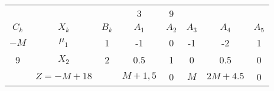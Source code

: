     \begin{tabular}{cccccccc}
    \hline
    \hline
            &         &         & 3       & 9       &         &         &  \bigstrut[t]\\
    $C_k$   & $X_k$   & $B_k$   & $A_1$   & $A_2$   & $A_3$   & $A_4$   & $A_5$ \bigstrut[b]\\
    \hline
    $-M$    & $\mu_1$ & 1       & -1      & 0       & -1      & -2      & 1 \bigstrut[t]\\
    9       & $X_2$   & 2       & 0.5     & 1       & 0       & 0.5     & 0 \bigstrut[b]\\
    \hline
            & $Z=-M+18$ &         & $M+1,5$ & 0       & $M$     & $2M+4.5$ & 0 \bigstrut\\
    \hline
    \hline
    \end{tabular}%
